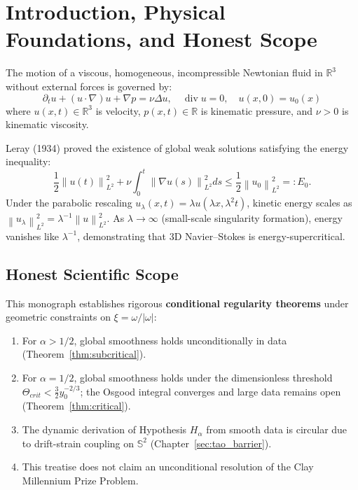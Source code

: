\documentclass[11pt,reqno]{amsart}
\numberwithin{equation}{section}
\theoremstyle{definition}
\newcommand{\R}{\mathbb{R}}
\newcommand{\Sspec}{\mathbb{S}}
\newcommand{\norm}[1]{\left\lVert#1\right\rVert}
\begin{document}
\maketitle
\tableofcontents
\newpage

\section{Introduction, Physical Foundations, and Honest Scope}

The motion of a viscous, homogeneous, incompressible Newtonian fluid in $\R^3$ without external forces is governed by:
\begin{equation}\label{eq:NS}
\partial_t u + (u \cdot \nabla) u + \nabla p = \nu \Delta u, \quad \operatorname{div} u = 0, \quad u(x, 0) = u_0(x)
\end{equation}
where $u(x,t) \in \R^3$ is velocity, $p(x,t) \in \R$ is kinematic pressure, and $\nu > 0$ is kinematic viscosity.

Leray (1934) proved the existence of global weak solutions satisfying the energy inequality:
\begin{equation}\label{eq:energy_inequality}
\frac{1}{2} \norm{u(t)}_{L^2}^2 + \nu \int_0^t \norm{\nabla u(s)}_{L^2}^2 ds \le \frac{1}{2} \norm{u_0}_{L^2}^2 =: E_0.
\end{equation}
Under the parabolic rescaling $u_\lambda(x,t) = \lambda u(\lambda x, \lambda^2 t)$, kinetic energy scales as $\norm{u_\lambda}_{L^2}^2 = \lambda^{-1} \norm{u}_{L^2}^2$. As $\lambda \to \infty$ (small-scale singularity formation), energy vanishes like $\lambda^{-1}$, demonstrating that 3D Navier--Stokes is energy-supercritical.

\subsection*{Honest Scientific Scope}
This monograph establishes rigorous \textbf{conditional regularity theorems} under geometric constraints on $\xi = \omega / |\omega|$:
\begin{enumerate}[label=(\roman*)]
\item For $\alpha > 1/2$, global smoothness holds unconditionally in data (Theorem~\ref{thm:subcritical}).
\item For $\alpha = 1/2$, global smoothness holds under the dimensionless threshold $\Theta_{crit} < \frac{3}{2} y_0^{-2/3}$; the Osgood integral converges and large data remains open (Theorem~\ref{thm:critical}).
\item The dynamic derivation of Hypothesis $H_\alpha$ from smooth data is circular due to drift-strain coupling on $\Sspec^2$ (Chapter~\ref{sec:tao_barrier}).
\item This treatise does not claim an unconditional resolution of the Clay Millennium Prize Problem.
\end{enumerate}
\end{document}
